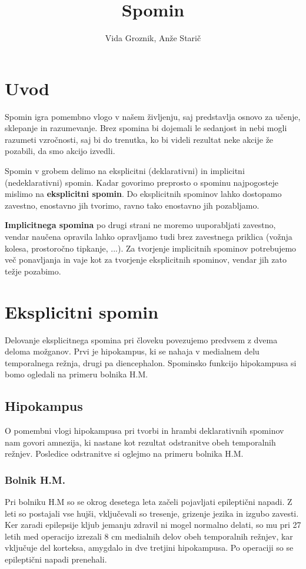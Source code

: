 \documentclass[10pt,a4paper]{article}
\author{Vida Groznik, Anže Starič}
\title{Spomin}
\begin{document}
\maketitle
\newpage

\section{Uvod}
Spomin igra pomembno vlogo v našem življenju, saj predstavlja osnovo za učenje, sklepanje in razumevanje. Brez spomina bi dojemali le sedanjost in nebi mogli razumeti vzročnosti, saj bi do trenutka, ko bi videli rezultat neke akcije že pozabili, da smo akcijo izvedli.

Spomin v grobem delimo na eksplicitni (deklarativni) in implicitni (nedeklarativni) spomin. Kadar govorimo preprosto o spominu najpogosteje mislimo na {\bf eksplicitni spomin}. Do eksplicitnih spominov lahko dostopamo zavestno, enostavno jih tvorimo, ravno tako enostavno jih pozabljamo.

{\bf Implicitnega spomina} po drugi strani ne moremo uuporabljati zavestno, vendar naučena opravila lahko opravljamo tudi brez zavestnega priklica (vožnja kolesa, prostoročno tipkanje, ...). Za tvorjenje implicitnih spominov potrebujemo več ponavljanja in vaje kot za tvorjenje eksplicitnih spominov, vendar jih zato težje pozabimo.

\section{Eksplicitni spomin}
Delovanje eksplicitnega spomina pri človeku povezujemo predvsem z dvema deloma možganov. Prvi je hipokampus, ki se nahaja v medialnem delu temporalnega režnja, drugi pa diencephalon. Spominsko funkcijo hipokampusa si bomo ogledali na primeru bolnika H.M.

\subsection{Hipokampus}
O pomembni vlogi hipokampusa pri tvorbi in hrambi deklarativnih spominov nam govori amnezija, ki nastane kot rezultat odstranitve obeh temporalnih režnjev. Posledice odstranitve si oglejmo na primeru bolnika H.M.

\subsubsection{Bolnik H.M.}
Pri bolniku H.M so se okrog desetega leta začeli pojavljati epileptični napadi. Z leti so postajali vse hujši, vključevali so tresenje, grizenje jezika in izgubo zavesti. Ker zaradi epilepsije kljub jemanju zdravil ni mogel normalno delati, so mu pri 27 letih med operacijo izrezali 8 cm medialnih delov obeh temporalnih režnjev, kar vključuje del korteksa, amygdalo in dve tretjini hipokampusa. Po operaciji so se epileptični napadi prenehali.
\end{document}
